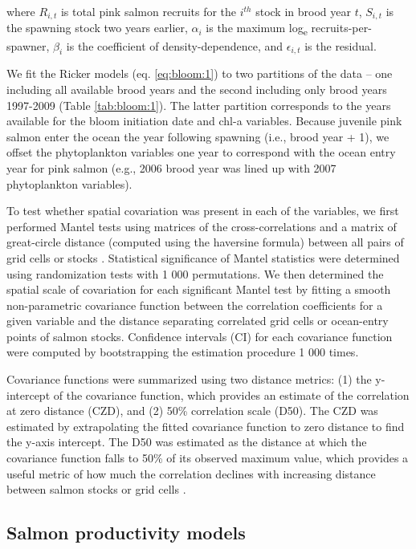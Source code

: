 \noindent
where \(R_{i,t}\) is total pink salmon recruits for the \(i^{th}\) stock in
brood year \(t\), \(S_{i,t}\) is the spawning stock two years earlier,
\(\alpha_i\) is the maximum log\textsubscript{e} recruits-per-spawner,
\(\beta_i\) is the coefficient of density-dependence, and \(\epsilon_{i,t}\) is
the residual.

We fit the Ricker models (eq. \ref{eq:bloom:1}) to two partitions of the data -- one
including all available brood years and the second including only brood years
1997-2009 (Table \ref{tab:bloom:1}). The latter partition corresponds to the years available for
the bloom initiation date and chl-a variables. Because juvenile pink salmon
enter the ocean the year following spawning (i.e., brood year + 1), we offset
the phytoplankton variables one year to correspond with the ocean entry year for
pink salmon (e.g., 2006 brood year was lined up with 2007 phytoplankton
variables).

To test whether spatial covariation was present in each of the variables, we
first performed Mantel tests using matrices of the cross-correlations and a
matrix of great-circle distance (computed using the haversine formula) between
all pairs of grid cells or stocks \citep{Legendre1998a, Koenig1999a}.
Statistical significance of Mantel statistics were determined using
randomization tests with 1 000 permutations. We then determined the spatial
scale of covariation for each significant Mantel test by fitting a smooth
non-parametric covariance function \citep{Bjornstad2001a} between the
correlation coefficients for a given variable and the distance separating
correlated grid cells or ocean-entry points of salmon stocks. Confidence
intervals (CI) for each covariance function were computed by bootstrapping the
estimation procedure 1 000 times.

Covariance functions were summarized using two distance metrics: (1) the
y-intercept of the covariance function, which provides an estimate of the
correlation at zero distance (CZD), and (2) 50\% correlation scale (D50). The
CZD was estimated by extrapolating the fitted covariance function to zero
distance to find the y-axis intercept. The D50 was estimated as the distance at
which the covariance function falls to 50\% of its observed maximum value, which
provides a useful metric of how much the correlation declines with increasing
distance between salmon stocks or grid cells \citep{Mueter2002b}.

\subsection{Salmon productivity models}

